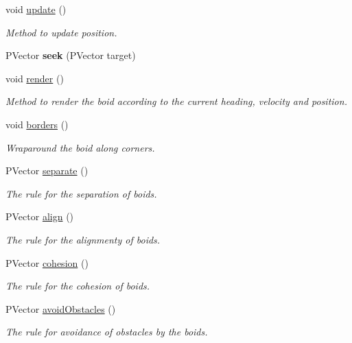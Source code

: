\begin{DoxyCompactItemize}
\mbox{\label{class_boid_a688446a89dbcacbd32cfbb49074eee46}} 
void \mbox{\hyperlink{class_boid_a688446a89dbcacbd32cfbb49074eee46}{update}} ()
\begin{DoxyCompactList}\small\item\em Method to update position. \end{DoxyCompactList}\item 
\mbox{\label{class_boid_afb58db2cab7b093448fedfdcc09fd276}} 
P\+Vector {\bfseries seek} (P\+Vector target)
\item 
void \mbox{\hyperlink{class_boid_a3dcde93686101c36fbf97a0dd2f2743b}{render}} ()
\begin{DoxyCompactList}\small\item\em Method to render the boid according to the current heading, velocity and position. \end{DoxyCompactList}\item 
void \mbox{\hyperlink{class_boid_a972b44c740e6c93920e66be20ffeed81}{borders}} ()
\begin{DoxyCompactList}\small\item\em Wraparound the boid along corners. \end{DoxyCompactList}\item 
\mbox{\label{class_boid_a6d784c3643c0fa5b8865def7f6f63437}} 
P\+Vector \mbox{\hyperlink{class_boid_a6d784c3643c0fa5b8865def7f6f63437}{separate}} ()
\begin{DoxyCompactList}\small\item\em The rule for the separation of boids. \end{DoxyCompactList}\item 
\mbox{\label{class_boid_aecb2dfae64c75103498178e7d1db696b}} 
P\+Vector \mbox{\hyperlink{class_boid_aecb2dfae64c75103498178e7d1db696b}{align}} ()
\begin{DoxyCompactList}\small\item\em The rule for the alignmenty of boids. \end{DoxyCompactList}\item 
\mbox{\label{class_boid_ae4805e8086160ded6399c44ec6d168fb}} 
P\+Vector \mbox{\hyperlink{class_boid_ae4805e8086160ded6399c44ec6d168fb}{cohesion}} ()
\begin{DoxyCompactList}\small\item\em The rule for the cohesion of boids. \end{DoxyCompactList}\item 
\mbox{\label{class_boid_a88de6e18e38e062b6363bfb2741d85f7}} 
P\+Vector \mbox{\hyperlink{class_boid_a88de6e18e38e062b6363bfb2741d85f7}{avoid\+Obstacles}} ()
\begin{DoxyCompactList}\small\item\em The rule for avoidance of obstacles by the boids. \end{DoxyCompactList}\end{DoxyCompactItemize}
